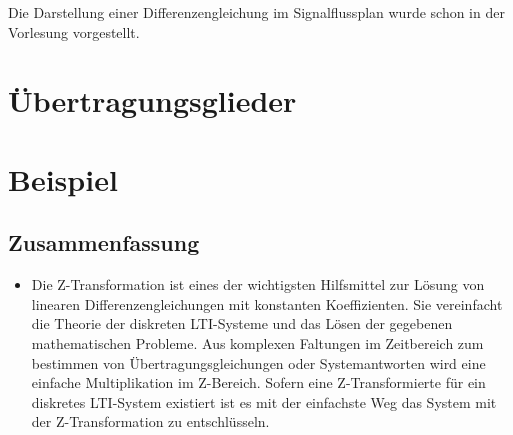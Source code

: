 \documentclass[11pt]{article}
\providecommand{\tightlist}{%
      \setlength{\itemsep}{0pt}\setlength{\parskip}{0pt}}
\begin{document}
Die Darstellung einer Differenzengleichung im Signalflussplan wurde
schon in der Vorlesung vorgestellt.

    \section{Übertragungsglieder}\label{uxfcbertragungsglieder}

    \section{Beispiel}\label{beispiel}

    \subsection{Zusammenfassung}\label{zusammenfassung}

\begin{itemize}
\tightlist
\item
  Die Z-Transformation ist eines der wichtigsten Hilfsmittel zur Lösung
  von linearen Differenzengleichungen mit konstanten Koeffizienten. Sie
  vereinfacht die Theorie der diskreten LTI-Systeme und das Lösen der
  gegebenen mathematischen Probleme. Aus komplexen Faltungen im
  Zeitbereich zum bestimmen von Übertragungsgleichungen oder
  Systemantworten wird eine einfache Multiplikation im Z-Bereich. Sofern
  eine Z-Transformierte für ein diskretes LTI-System existiert ist es
  mit der einfachste Weg das System mit der Z-Transformation zu
  entschlüsseln.
\end{itemize}


    
    
    
    
\end{document}
